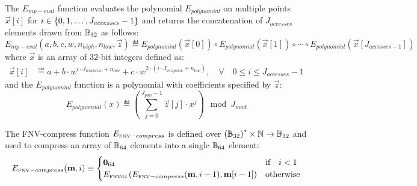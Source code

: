 
The $E_{mp-eval}$ function evaluates the polynomial $E_{polynomial}$ on multiple points $\vec{x}[i]$ for $i\in {\left \{{0,1,\dots, J_{accesses}-1} \right \}}$ and returns the concatenation of $J_{accesses}$ elements drawn from $\mathbb{B}_{32}$ as follows:
\begin{equation}
	E_{mp-eval}(a,b,c,w,n_{high},n_{low},\vec{z}) \eqdef 
	E_{polynomial}\left(\vec{x}[0]\right) \circ E_{polynomial}\left(\vec{x}[1]\right) \circ \cdots \circ
	E_{polynomial}\left(\vec{x}[J_{accesses-1}]\right)
\end{equation}
where $\vec{x}$ is an array of $32$-bit integers defined as:
\begin{align}
	\vec{x}[i] &\eqdef a+b\cdot w^{i\cdot J_{wrapsize} + n_{low}} + c\cdot w^{2\cdot (i\cdot J_{wrapsize} + n_{low})}, \quad \forall \quad 0\le i \le J_{accesses}-1 
\end{align}
and the $E_{polynomial}$ function is a polynomial with coefficients specified by $\vec{z}$:
\begin{equation}
	E_{polynomial}(x) \eqdef \left(\sum_{j=0}^{J_{pow}-1} \vec{z}[j]\cdot x^j\right) \mod J_{mod}
\end{equation}

The FNV-compress function $E_{\text{\tiny FNV}-compress}$ is defined over $\left(\mathbb{B}_{32}\right)^* \times \mathbb{N} \to \mathbb{B}_{32}$ 
and used to compress an array of $\mathbb{B}_{64}$ elements into a single $\mathbb{B}_{64}$ element:
\begin{equation}
	E_{\text{\tiny FNV}-compress}(\mathbf{m},i) \equiv 
	\begin{cases}
		\mathbf{0}_{64} & \text{if} \quad i < 1 \\
		E_\text{\tiny FNV64}\left( 
		E_{\text{\tiny FNV}-compress}(\mathbf{m},i-1) ,
		\mathbf{m}[i-1]\right)
		& \text{otherwise}
	\end{cases}
\end{equation}
